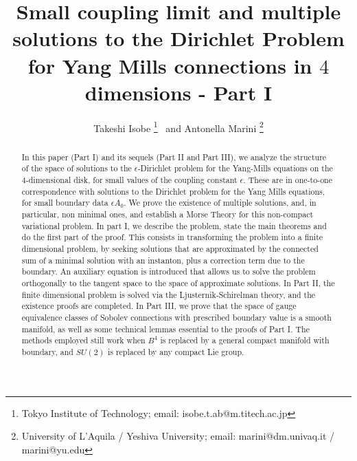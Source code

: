 \documentclass[11pt]{article}
\numberwithin{equation}{section} \setlength{\topmargin}{-35pt}
\begin{document}
\setlength{\baselineskip}{17pt}

\title{Small coupling limit and multiple solutions to the Dirichlet
Problem for Yang Mills connections in $4$ dimensions - Part I}
\author{Takeshi Isobe \thanks {%
Tokyo Institute of Technology; email:
isobe.t.ab@m.titech.ac.jp} $\,$ and Antonella Marini \thanks {%
University of L'Aquila / Yeshiva University; email:
marini@dm.univaq.it / marini@yu.edu}}


\date{}
\maketitle

\begin{abstract}
{\footnotesize \baselineskip 4mm} In this paper (Part I) and its
sequels (Part II and Part III), we analyze the structure of
the space of solutions to the $\epsilon$-Dirichlet problem for the Yang-Mills
equations on the $4$-dimensional disk, for small values of the
coupling constant $\epsilon$. These are in one-to-one correspondence with solutions
to the Dirichlet problem for the Yang Mills
equations, for small boundary data $\epsilon A_0$. We prove the existence of multiple
solutions, and, in particular, non minimal ones, and establish a
Morse Theory for this non-compact variational problem. In part I, we
describe the problem, state the main theorems and do the first part
of the proof. This consists in transforming the problem into a
finite dimensional problem, by seeking solutions that are
approximated by the connected sum of a minimal solution with an
instanton, plus a correction term due to the boundary. An auxiliary
equation is introduced that allows us to solve the problem
orthogonally to the tangent space to the space of approximate
solutions. In Part II, the finite dimensional problem is solved via
the Ljusternik-Schirelman theory, and the existence proofs are
completed. In Part III, we prove that the space of gauge equivalence
classes of Sobolev connections with prescribed boundary value is a
smooth manifold, as well as some technical lemmas essential to the
proofs of Part I. The methods employed still work when $B^4$ is
replaced by a general compact manifold with boundary, and $SU(2)$ is
replaced by any compact Lie group.
\end{abstract}
\end{document}
